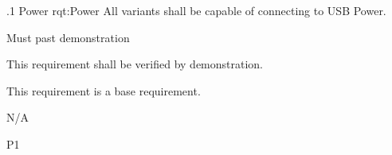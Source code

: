 \ONERQMTVKPP
{\RqtNumberBase.1}
{Power}
{rqt:Power}
{All \ThisSys variants shall be capable of connecting to USB Power.}
{
	\item [Phase 1] Must past demonstration
}
{This requirement shall be verified by demonstration.}
{
	\item [N/A] This requirement is a base requirement.
}
{
  \item N/A
}
{P1}


